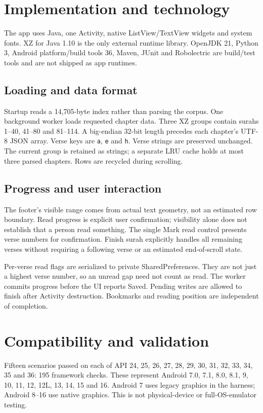 \documentclass[11pt,a4paper]{article}
\begin{document}
\section{Implementation and technology}
The app uses Java, one Activity, native ListView/TextView widgets and
system fonts. XZ for Java 1.10 is the only external runtime library.
OpenJDK 21, Python 3, Android platform/build tools 36, Maven, JUnit and
Robolectric are build/test tools and are not shipped as app runtimes.
\subsection{Loading and data format}
Startup reads a 14,705-byte index rather than parsing the corpus. One
background worker loads requested chapter data. Three XZ groups contain
surahs 1--40, 41--80 and 81--114. A big-endian 32-bit length precedes each
chapter's UTF-8 JSON array. Verse keys are \texttt{a}, \texttt{e} and
\texttt{h}. Verse strings are preserved unchanged. The current group is
retained as strings; a separate LRU cache holds at most three parsed
chapters. Rows are recycled during scrolling.
\subsection{Progress and user interaction}
The footer's visible range comes from actual text geometry, not an
estimated row boundary. Read progress is explicit user confirmation;
visibility alone does not establish that a person read something.
The single Mark read control presents verse numbers for confirmation.
Finish surah explicitly handles all remaining verses without requiring a
following verse or an estimated end-of-scroll state.

Per-verse read flags are serialized to private SharedPreferences. They are
not just a highest verse number, so an unread gap need not count as read.
The worker commits progress before the UI reports Saved. Pending writes
are allowed to finish after Activity destruction. Bookmarks and reading
position are independent of completion.

\section{Compatibility and validation}
Fifteen scenarios passed on each of API 24, 25, 26, 27, 28, 29, 30, 31,
32, 33, 34, 35 and 36: 195 framework checks. These represent Android 7.0,
7.1, 8.0, 8.1, 9, 10, 11, 12, 12L, 13, 14, 15 and 16.
Android 7 uses legacy graphics in the harness; Android 8--16 use native
graphics. This is not physical-device or full-OS-emulator testing.
\end{document}
